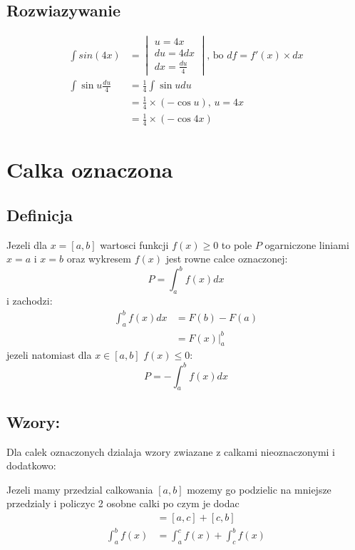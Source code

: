 \documentclass[]{article}
\begin{document}
\subsection{Rozwiazywanie}

\begin{align}
  \int{sin(4x)} &=
  \begin{vmatrix}
    u =4x\\
    du=4dx\\
    dx= \frac{du}{4}
  \end{vmatrix}
  \text{, bo \ } df=f'(x)\times dx \\
  \int{\sin{u}\frac{du}{4}} &= \frac{1}{4} \int{\sin{u}du} \\
  &= \frac{1}{4} \times (-\cos{u})\text{, }u=4x \\
  &= \frac{1}{4} \times (-\cos{4x}) 
\end{align}

\section{Calka oznaczona}
\label{sec:calka oznaczona}
\subsection{Definicja}
\label{subsec:Definicja calka oznaczona}
Jezeli dla $x=[a,b]$ wartosci funkcji $f(x) \ge 0$ to pole $P$ ogarniczone liniami $x = a$ i $x = b$ oraz wykresem $f(x)$ jest rowne calce oznaczonej:
\begin{equation}
P = \int_{a}^{b}f(x)dx
\end{equation}
i zachodzi:
\begin{align}
  \int_{a}^{b}{f(x)dx} &= F(b) - F(a) \\
  &= F(x) |^b_{a}
\end{align}
jezeli natomiast dla $x \in [a,b]$ $f(x) \le 0$:
\begin{equation}
  \label{}
P = -\int_a^b{f(x)dx}
\end{equation}
\subsection{Wzory:}
\par
Dla calek oznaczonych dzialaja wzory zwiazane z calkami nieoznaczonymi i dodatkowo:
\par
Jezeli mamy przedzial calkowania $[a,b]$ mozemy go podzielic na mniejsze przedzialy i policzyc 2 osobne calki po czym je dodac
\begin{align}
  [a,b] &= [a,c] + [c,b] \\
  \int_a^b{f(x)} &= \int_a^c{f(x)} + \int_c^b{f(x)} 
\end{align}
\end{document}
